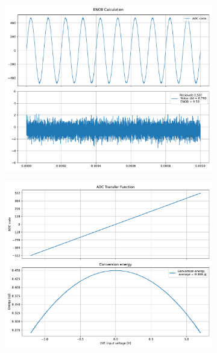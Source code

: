 \documentclass[varwidth]{standalone}
\begin{document}
\begin{figure}
\begin{subfigure}{0.32\textwidth}
    \includegraphics[width=\textwidth]{behavioral_10b_mismatch_radix175norm_enob.pdf}
\end{subfigure}
\begin{subfigure}{0.32\textwidth}
    \begin{table}
    \let\center\empty
    \let\endcenter\relax
    \centering
    \resizebox{0.3\width}{!}{}
    \end{table}
    \includegraphics[width=\textwidth]{behavioral_10b_mismatch_radix175norm_energy.pdf}
\end{subfigure}
\end{figure}
\end{document}

